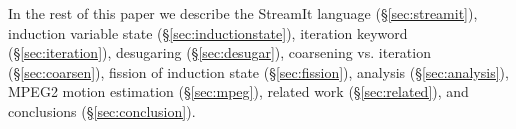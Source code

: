 In the rest of this paper we describe 
the StreamIt language (\S\ref{sec:streamit}), 
induction variable state (\S\ref{sec:inductionstate}), 
iteration keyword (\S\ref{sec:iteration}), 
desugaring (\S\ref{sec:desugar}), 
coarsening vs. iteration (\S\ref{sec:coarsen}),
fission of induction state (\S\ref{sec:fission}),
analysis (\S\ref{sec:analysis}),
MPEG2 motion estimation (\S\ref{sec:mpeg}), 
related work (\S\ref{sec:related}),
and conclusions (\S\ref{sec:conclusion}).







